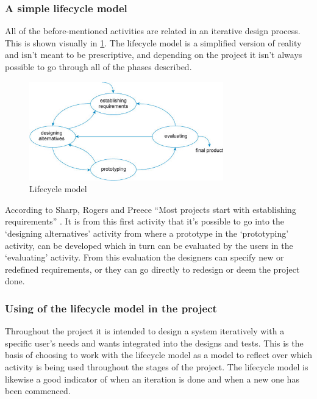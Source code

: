 \subsubsection{A simple lifecycle model}
All of the before-mentioned activities are related in an iterative design process. This is shown visually in \cref{fig:LifecycleModel}. The lifecycle model is a simplified version of reality and isn’t meant to be prescriptive, and depending on the project it isn’t always possible to go through all of the phases described. 

\begin{figure}[h]
	\centering
	\includegraphics[width=0.75\textwidth]{billeder/lifecycle.png}
	\caption{Lifecycle model \citep[p.~332]{InteractionDesign}}\label{fig:LifecycleModel}
\end{figure}

According to Sharp, Rogers and Preece “Most projects start with establishing requirements” \citep[p.~333]{InteractionDesign}. It is from this first activity that it’s possible to go into the ‘designing alternatives’ activity from where a prototype in the ‘prototyping’ activity, can be developed which in turn can be evaluated by the users in the ‘evaluating’ activity. From this evaluation the designers can specify new or redefined requirements, or they can go directly to redesign or deem the project done.
\subsubsection{Using of the lifecycle model in the project}
Throughout the project it is intended to design a system iteratively with a specific user’s needs and wants integrated into the designs and tests. This is the basis of choosing to work with the lifecycle model as a model to reflect over which activity is being used throughout the stages of the project. The lifecycle model is likewise a good indicator of when an iteration is done and when a new one has been commenced.




